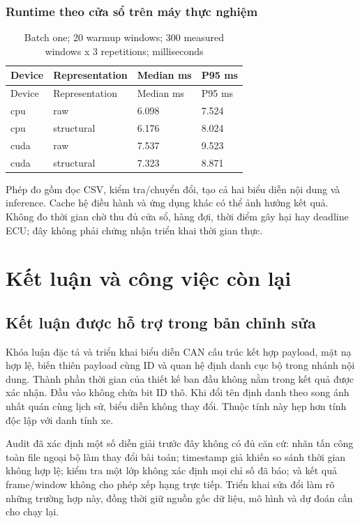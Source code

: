 \documentclass[12pt,a4paper,oneside,openany]{extbook}
\begin{document}
\subsection{Runtime theo cửa sổ trên máy thực nghiệm}
\begin{longtable}{P{2.0cm}P{3.6cm}P{3.2cm}P{3.2cm}}
\caption{Batch one; 20 warmup windows; 300 measured windows x 3 repetitions; milliseconds}\label{tab:extension-runtime}\\\toprule
Device & Representation & Median ms & P95 ms\\\midrule\endfirsthead
\toprule
Device & Representation & Median ms & P95 ms\\\midrule\endhead
cpu & raw & 6.098 & 7.524\\
cpu & structural & 6.176 & 8.024\\
cuda & raw & 7.537 & 9.523\\
cuda & structural & 7.323 & 8.871\\
\bottomrule\end{longtable}
Phép đo gồm đọc CSV, kiểm tra/chuyển đổi, tạo cả hai biểu diễn nội dung và inference. Cache hệ điều hành và ứng dụng khác có thể ảnh hưởng kết quả. Không đo thời gian chờ thu đủ cửa sổ, hàng đợi, thời điểm gây hại hay deadline ECU; đây không phải chứng nhận triển khai thời gian thực.


\chapter{Kết luận và công việc còn lại}\label{chap:conclusion}
\section{Kết luận được hỗ trợ trong bản chỉnh sửa}
Khóa luận đặc tả và triển khai biểu diễn CAN cấu trúc kết hợp payload, mặt nạ hợp lệ, biến thiên payload cùng ID và quan hệ định danh cục bộ trong nhánh nội dung. Thành phần thời gian của thiết kế ban đầu không nằm trong kết quả được xác nhận. Đầu vào không chứa bit ID thô. Khi đổi tên định danh theo song ánh nhất quán cùng lịch sử, biểu diễn không thay đổi. Thuộc tính này hẹp hơn tính độc lập với danh tính xe.

Audit đã xác định một số diễn giải trước đây không có đủ căn cứ: nhãn tấn công toàn file ngoại bộ làm thay đổi bài toán; timestamp giả khiến so sánh thời gian không hợp lệ; kiểm tra một lớp không xác định mọi chỉ số đã báo; và kết quả frame/window không cho phép xếp hạng trực tiếp. Triển khai sửa đổi làm rõ những trường hợp này, đồng thời giữ nguồn gốc dữ liệu, mô hình và dự đoán cần cho chạy lại.
\end{document}
